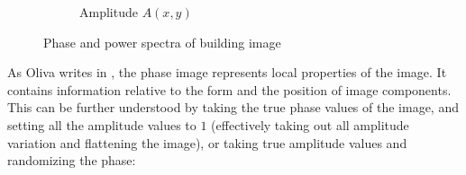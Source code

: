 \documentclass{report}
\begin{document}
\begin{figure}[H]
\begin{subfigure}[b]{0.2\textwidth}
                \caption{Amplitude $A(x,y)$}
                \label{fig:tiger}
        \end{subfigure}
        \caption{Phase and power spectra of building image}\label{fig:fft_localization}
\end{figure}
As Oliva writes in \cite{gist_descriptor}, the phase image represents local properties of the image. It contains information relative to the form and the position of image components. This can be further understood by taking the true phase values of the image, and setting all the amplitude values to $1$ (effectively taking out all amplitude variation and flattening the image), or taking true amplitude values and randomizing the phase:
\end{document}
